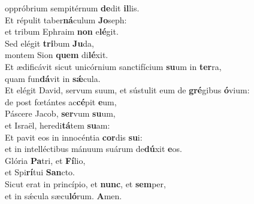 \evenverse oppróbrium sempitérnum \textbf{de}dit \textbf{il}lis.\\
\oddverse Et répulit taber\textbf{ná}culum \textbf{Jo}seph:~\*\\
\oddverse et tribum Ephraim \textbf{non} e\textbf{lé}git.\\
\evenverse Sed elégit \textbf{tri}bum \textbf{Ju}da,~\*\\
\evenverse montem Sion \textbf{quem} di\textbf{lé}xit.\\
\oddverse Et ædificávit sicut unicórnium sanctifícium \textbf{su}um in \textbf{ter}ra,~\*\\
\oddverse quam fun\textbf{dá}vit in \textbf{sǽ}cula.\\
\evenverse Et elégit David, servum suum, et sústulit eum de \textbf{gré}gibus \textbf{ó}vium:~\*\\
\evenverse de post fœtántes ac\textbf{cé}pit \textbf{e}um,\\
\oddverse Páscere Jacob, \textbf{ser}vum \textbf{su}um,~\*\\
\oddverse et Israël, heredi\textbf{tá}tem \textbf{su}am:\\
\evenverse Et pavit eos in innocéntia \textbf{cor}dis \textbf{su}i:~\*\\
\evenverse et in intelléctibus mánuum suárum de\textbf{dú}xit \textbf{e}os.\\
\oddverse Glória \textbf{Pa}tri, et \textbf{Fí}lio,~\*\\
\oddverse et Spi\textbf{rí}tui \textbf{San}cto.\\
\evenverse Sicut erat in princípio, et \textbf{nunc}, et \textbf{sem}per,~\*\\
\evenverse et in sǽcula sæcu\textbf{ló}rum. \textbf{A}men.\\
